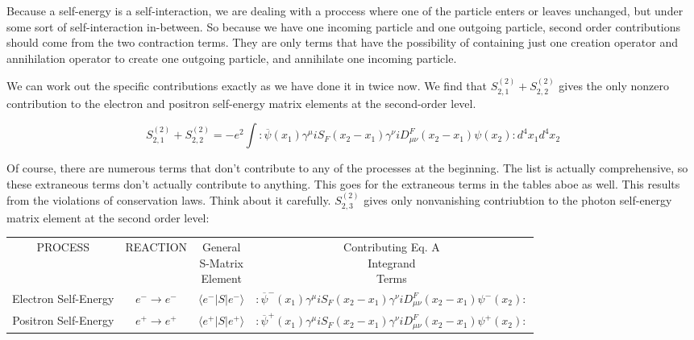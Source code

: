 \documentclass[a4]{article}
\begin{document}
    Because a self-energy is a self-interaction, we are dealing with a proccess where one of the particle enters or leaves unchanged, but under some sort of
    self-interaction in-between. So because we have one incoming particle and one outgoing particle, second order contributions should come from the two
    contraction terms. They are only terms that have the possibility of containing just one creation operator and annihilation operator to create one outgoing
    particle, and annihilate one incoming particle.

    We can work out the specific contributions exactly as we have done it in twice now. We find that $S^{(2)}_{2,1} + S^{(2)}_{2,2}$ gives the only nonzero
    contribution to the electron and positron self-energy matrix elements at the second-order level.
    
    \begin{framed}
        \begin{equation}
            S^{(2)}_{2,1} + S^{(2)}_{2,2} = -e^{2} \int :\overline{\psi} (x_1) \gamma^{\mu} i S_{F} (x_2 - x_1) \gamma^{\nu} i D_{\mu \nu}^{F} (x_2 - x_1) \psi (x_2): d^{4} x_{1} d^{4} x_{2}
        \end{equation}
    \end{framed}

    Of course, there are numerous terms that don't contribute to any of the processes at the beginning. The list is actually comprehensive, so these extraneous
    terms don't actually contribute to anything. This goes for the extraneous terms in the tables aboe as well. This results from the violations of conservation
    laws. Think about it carefully. $S^{(2)}_{2,3}$ gives only nonvanishing contriubtion to the photon self-energy matrix element at the second order level:


    \begin{framed}
        \begin{tabular}{c c c c}
            PROCESS & REACTION & \shortstack{General \\ S-Matrix \\ Element} & \shortstack{Contributing Eq. A \\ Integrand \\ Terms} \\
            Electron Self-Energy & $e^{-} \rightarrow e^{-}$ & $\langle e^{-} | S | e^{-} \rangle$ & $:\overline{\psi}^{-} (x_1) \gamma^{\mu} i S_{F} (x_2 - x_1) \gamma^{\nu} i D_{\mu \nu}^{F} (x_2 - x_1) \psi^{-} (x_2):$ \\
            Positron Self-Energy & $e^{+} \rightarrow e^{+}$ & $\langle e^{+} | S | e^{+} \rangle$ & $:\overline{\psi}^{+} (x_1) \gamma^{\mu} i S_{F} (x_2 - x_1) \gamma^{\nu} i D_{\mu \nu}^{F} (x_2 - x_1) \psi^{+} (x_2):$
        \end{tabular}
    \end{framed}
\end{document}
